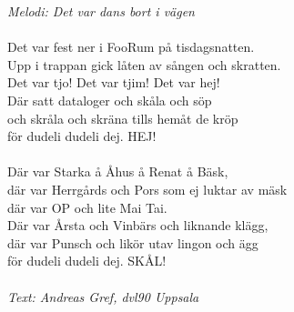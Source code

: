 {\footnotesize\textit{Melodi: Det var dans bort i vägen}}\\
\\
Det var fest ner i FooRum på tisdagsnatten.\\
Upp i trappan gick låten av sången och skratten.\\
Det var tjo! Det var tjim! Det var hej!\\
Där satt dataloger och skåla och söp\\
och skråla och skräna tills hemåt de kröp\\
för dudeli dudeli dej. HEJ!\\
\\
Där var Starka å Åhus å Renat å Bäsk,\\
där var Herrgårds och Pors som ej luktar av mäsk\\
där var OP och lite Mai Tai.\\
Där var Årsta och Vinbärs och liknande klägg,\\
där var Punsch och likör utav lingon och ägg\\
för dudeli dudeli dej. SKÅL!\\
\\
{\footnotesize\textit{Text: Andreas Gref, dvl90 Uppsala}}
